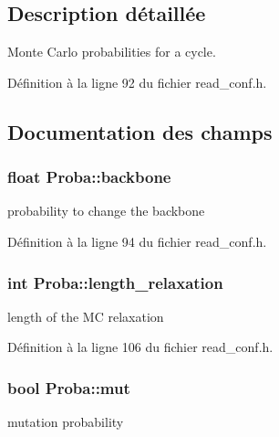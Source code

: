 \subsection{Description détaillée}
Monte Carlo probabilities for a cycle. 

Définition à la ligne 92 du fichier read\+\_\+conf.\+h.



\subsection{Documentation des champs}
\hypertarget{struct_proba_a0d99db17b016f293ec4e7fb87a7659c5}{
\subsubsection[{backbone}]{\setlength{\rightskip}{0pt plus 5cm}float Proba\+::backbone}}\label{struct_proba_a0d99db17b016f293ec4e7fb87a7659c5}


probability to change the backbone 



Définition à la ligne 94 du fichier read\+\_\+conf.\+h.

\hypertarget{struct_proba_ab672f681e88ef8d71a84091a9692bf56}{
\subsubsection[{length\+\_\+relaxation}]{\setlength{\rightskip}{0pt plus 5cm}int Proba\+::length\+\_\+relaxation}}\label{struct_proba_ab672f681e88ef8d71a84091a9692bf56}


length of the M\+C relaxation 



Définition à la ligne 106 du fichier read\+\_\+conf.\+h.

\hypertarget{struct_proba_a832f8efe020ca9f60a5c9cf7a7aecda5}{
\subsubsection[{mut}]{\setlength{\rightskip}{0pt plus 5cm}bool Proba\+::mut}}\label{struct_proba_a832f8efe020ca9f60a5c9cf7a7aecda5}


mutation probability 



